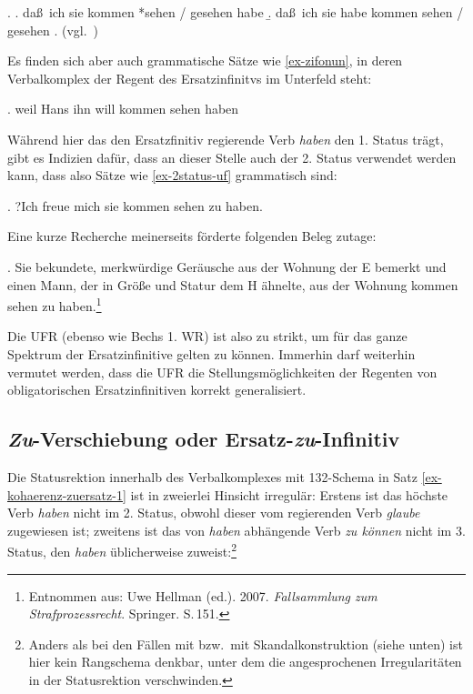 \ex. \label{ex-bech-5}
\a. da\ss\ ich sie kommen *sehen / gesehen habe
\b. da\ss\ ich sie habe kommen sehen / gesehen
\z. (vgl.\ \citealt[\S 20]{Bech:63}) 

Es finden sich aber auch grammatische Sätze wie \ref{ex-zifonun}, in deren Verbalkomplex der Regent des Ersatzinfinitvs im Unterfeld steht:

\ex. \label{ex-zifonun}weil Hans ihn will kommen sehen haben \hfill 
\citep[1286]{Zifonun:etal:97}

Während hier das den Ersatzfinitiv regierende Verb {\it haben} den 1. Status trägt, gibt es Indizien dafür, dass an dieser Stelle auch der 2. Status verwendet werden kann, dass also Sätze wie \ref{ex-2status-uf} grammatisch sind:

\ex. ?Ich freue mich sie kommen sehen zu haben. \label{ex-2status-uf}

Eine kurze Recherche meinerseits förderte folgenden Beleg zutage:

\ex. Sie bekundete, merkwürdige Geräusche aus der Wohnung der E bemerkt und einen Mann, der in Grö\ss e und Statur dem H ähnelte, aus der Wohnung kommen sehen zu haben.\footnote{Entnommen aus: Uwe Hellman (ed.). 2007. \textit{Fallsammlung zum Strafprozessrecht}. Springer. S.\,151.}\label{ex-2status-uf-corpus}

Die UFR (ebenso wie Bechs 1. WR) ist also zu strikt, um für das ganze Spektrum der Ersatzinfinitive gelten zu können. Immerhin darf weiterhin vermutet werden, dass die UFR die Stellungsmöglichkeiten der Regenten von obligatorischen Ersatzinfinitiven korrekt generalisiert. 



\subsection{\emph{Zu}-Verschiebung oder Ersatz-\emph{zu}-Infinitiv}

%
Die Statusrektion innerhalb des Verbalkomplexes mit 132-Schema in Satz \ref{ex-kohaerenz-zuersatz-1} ist in zweierlei Hinsicht irregulär: Erstens ist das höchste Verb {\it haben} nicht im 2. Status, obwohl dieser vom regierenden Verb {\it glaube} zugewiesen ist; zweitens ist das von {\it haben} abhängende Verb {\it zu können} nicht im 3. Status, den {\it haben} üblicherweise zuweist:\footnote{Anders als bei den Fällen mit  bzw.\ mit Skandalkonstruktion (siehe unten) ist hier kein Rangschema denkbar, unter dem die angesprochenen Irregularitäten in der Statusrektion verschwinden.}

